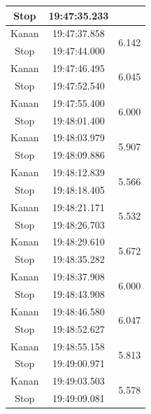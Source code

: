 \begin{longtable}{|c|c|c|}
  Stop           & 19:47:35.233        &                         \\ \hline
  Kanan          & 19:47:37.858        & \multirow{2}{*}{6.142}  \\ \cline{1-2}
  Stop           & 19:47:44.000        &                         \\ \hline
  Kanan          & 19:47:46.495        & \multirow{2}{*}{6.045}  \\ \cline{1-2}
  Stop           & 19:47:52.540        &                         \\ \hline
  Kanan          & 19:47:55.400        & \multirow{2}{*}{6.000}  \\ \cline{1-2}
  Stop           & 19:48:01.400        &                         \\ \hline
  Kanan          & 19:48:03.979        & \multirow{2}{*}{5.907}  \\ \cline{1-2}
  Stop           & 19:48:09.886        &                         \\ \hline
  Kanan          & 19:48:12.839        & \multirow{2}{*}{5.566}  \\ \cline{1-2}
  Stop           & 19:48:18.405        &                         \\ \hline
  Kanan          & 19:48:21.171        & \multirow{2}{*}{5.532}  \\ \cline{1-2}
  Stop           & 19:48:26.703        &                         \\ \hline
  Kanan          & 19:48:29.610        & \multirow{2}{*}{5.672}  \\ \cline{1-2}
  Stop           & 19:48:35.282        &                         \\ \hline
  Kanan          & 19:48:37.908        & \multirow{2}{*}{6.000}  \\ \cline{1-2}
  Stop           & 19:48:43.908        &                         \\ \hline
  Kanan          & 19:48:46.580        & \multirow{2}{*}{6.047}  \\ \cline{1-2}
  Stop           & 19:48:52.627        &                         \\ \hline
  Kanan          & 19:48:55.158        & \multirow{2}{*}{5.813}  \\ \cline{1-2}
  Stop           & 19:49:00.971        &                         \\ \hline
  Kanan          & 19:49:03.503        & \multirow{2}{*}{5.578}  \\ \cline{1-2}
  Stop           & 19:49:09.081        &                         \\ \hline

\end{longtable}
